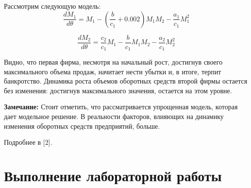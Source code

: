 \documentclass[
  12pt,
  a4paper,
]{scrreprt}
\begin{document}
Рассмотрим следующую модель: \[
\dfrac{dM_1}{d\theta} = M_1 - (\frac{b}{c_1} + 0.002)M_1M_2 - \frac{a_1}{c_1}M_1^2
\]

\[
\dfrac{dM_2}{d\theta} = \frac{c_2}{c_1}M_1 - \frac{b}{c_1}M_1M_2 - \frac{a_2}{c_1}M_2^2
\]

Видно, что первая фирма, несмотря на начальный рост, достигнув своего
максимального объема продаж, начитает нести убытки и, в итоге, терпит
банкротство. Динамика роста объемов оборотных средств второй фирмы
остается без изменения: достигнув максимального значения, остается на
этом уровне.

\textbf{Замечание:} Стоит отметить, что рассматривается упрощенная
модель, которая дает модельное решение. В реальности факторов, влияющих
на динамику изменения оборотных средств предприятий, больше.

Подробнее в {[}2{]}.

\hypertarget{ux432ux44bux43fux43eux43bux43dux435ux43dux438ux435-ux43bux430ux431ux43eux440ux430ux442ux43eux440ux43dux43eux439-ux440ux430ux431ux43eux442ux44b}{%
\chapter{Выполнение лабораторной
работы}\label{ux432ux44bux43fux43eux43bux43dux435ux43dux438ux435-ux43bux430ux431ux43eux440ux430ux442ux43eux440ux43dux43eux439-ux440ux430ux431ux43eux442ux44b}}
\end{document}
